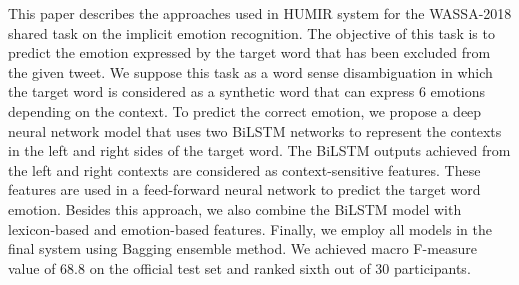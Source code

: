 This paper describes the approaches used in HUMIR system for the WASSA-2018 shared task on the implicit emotion recognition. The objective of this task is to predict the emotion expressed by the target word that has been excluded from the given tweet. We suppose this task as a word sense disambiguation in which the target word is considered as a synthetic word that can express 6 emotions depending on the context. To predict the correct emotion, we propose a deep neural network model that uses two BiLSTM networks to represent the contexts in the left and right sides of the target word. The BiLSTM outputs achieved from the left and right contexts are considered as context-sensitive features. These features are used in a feed-forward neural network to predict the target word emotion. Besides this approach, we also combine the BiLSTM model with lexicon-based and emotion-based features. Finally, we employ all models in the final system using Bagging ensemble method. We achieved macro F-measure value of 68.8 on the official test set and ranked sixth out of 30 participants.
